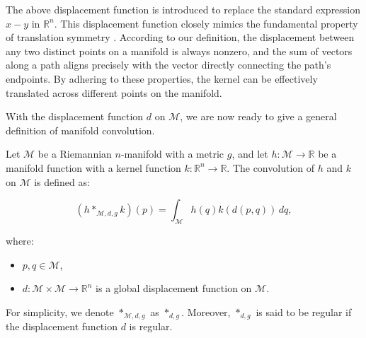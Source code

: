 The above displacement function is introduced to replace the standard expression $ x-y $ in $ \mathbb{R}^n $. This displacement function closely mimics the fundamental property of translation symmetry \cite{schonsheck2022parallel}. According to our definition, the displacement between any two distinct points on a manifold is always nonzero, and the sum of vectors along a path aligns precisely with the vector directly connecting the path’s endpoints. By adhering to these properties, the kernel can be effectively translated across different points on the manifold.

With the displacement function $d$ on $\mathcal{M}$, we are now ready to give a general definition of manifold convolution.

\begin{definition}\label{mani_conv}
Let $\mathcal{M}$ be a Riemannian $n$-manifold with a metric $g$, and let $h: \mathcal{M} \to \mathbb{R}$ be a manifold function with a kernel function $k: \mathbb{R}^{n}\to \mathbb{R}$. The convolution of $h$ and $k$ on $\mathcal{M}$ is defined as:

\begin{equation}\label{eq:mani_conv}
(h \ast_{\mathcal{M},d,g} k)(p) = \int_{\mathcal{M}} h(q) k(d(p, q)) \, dq,
\end{equation}

where:
\begin{itemize}
    \item $p, q \in \mathcal{M}$,
    \item $d: \mathcal{M}\times\mathcal{M} \to \mathbb{R}^n $ is a global displacement function on $\mathcal{M}$.
\end{itemize}
For simplicity, we denote $*_{\mathcal{M}, d,g}$ as $*_{d,g}$.
Moreover, $*_{d,g}$ is said to be regular if the displacement function $d$ is regular.

\end{definition}



